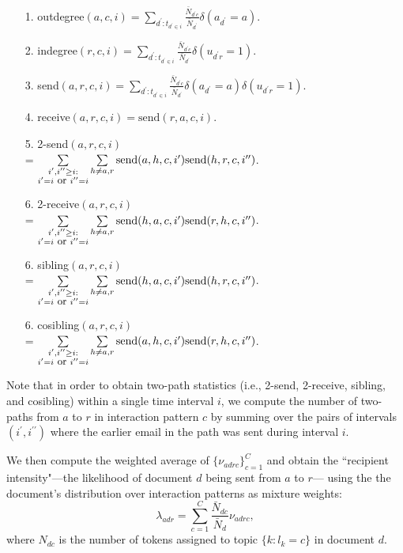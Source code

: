 \documentclass{article}
\begin{document}
\begin{itemize}
	\item[1.] outdegree$(a,c,i)=\sum\limits_{d^\prime:t_{d^\prime \in i}} \frac{\bar N_{d^\prime c}}{\bar N_{d^\prime}} \delta(a_{d^\prime} = a)$.
	\item[2.] indegree$(r,c,i)=\sum\limits_{d^\prime:t_{d^\prime \in i}} \frac{\bar N_{d^\prime c}}{\bar N_{d^\prime}} \delta(u_{d^\prime r} = 1)$.
	\item[3.] send$(a,r,c,i)=\sum\limits_{d^\prime:t_{d^\prime \in i}} \frac{\bar N_{d^\prime c}}{\bar N_{d^\prime}} \delta(a_{d^\prime} = a)\delta(u_{d^\prime r} = 1)$.
\item[4.] receive$(a,r,c,i)=\mbox{send}(r,a,c,i)$.
\item[5.] 2-send$(a,r,c,i) $\\= $\sum\limits_{\substack{i^\prime, i^{\prime\prime}\geq i:\\i^\prime = i \mbox{ \small or }i^{\prime\prime}=i}}\sum\limits_{h \neq a, r} \mbox{send}(a,h,c,i^\prime)\mbox{send}(h,r,c,i^{\prime\prime})$.
\item[6.] 2-receive$(a,r,c,i) $\\= $\sum\limits_{\substack{i^\prime, i^{\prime\prime}\geq i:\\i^\prime = i \mbox{ \small or }i^{\prime\prime}=i}}\sum\limits_{h \neq a, r} \mbox{send}(h,a,c,i^\prime)\mbox{send}(r,h,c,i^{\prime\prime})$.
\item[6.] sibling$(a,r,c,i) $\\= $\sum\limits_{\substack{i^\prime, i^{\prime\prime}\geq i:\\i^\prime = i \mbox{ \small or }i^{\prime\prime}=i}}\sum\limits_{h \neq a, r} \mbox{send}(h,a,c,i^\prime)\mbox{send}(h,r,c,i^{\prime\prime})$.
\item[6.] cosibling$(a,r,c,i) $\\= $\sum\limits_{\substack{i^\prime, i^{\prime\prime}\geq i:\\i^\prime = i \mbox{ \small or }i^{\prime\prime}=i}}\sum\limits_{h \neq a, r} \mbox{send}(a,h,c,i^\prime)\mbox{send}(r,h,c,i^{\prime\prime})$.
\end{itemize}
Note that in order to obtain two-path statistics (i.e., 2-send, 2-receive, sibling, and cosibling) within a single time interval $i$, we compute the number of two-paths from $a$ to $r$ in interaction pattern $c$ by summing over the pairs of intervals $(i^\prime, i^{\prime\prime})$ where the earlier email in the path was sent during interval $i$. 

We then compute the weighted average of $\{\nu_{adrc}\}_{c=1}^C$ and obtain the ``recipient intensity"---the likelihood of document $d$ being sent from $a$ to $r$--- using the the document's distribution over interaction patterns as mixture weights:
\begin{equation}
\lambda_{adr} =\sum_{c=1}^{C} \frac{\bar N_{dc}}{\bar N_d}\nu_{adrc},
\end{equation}
where $N_{dc}$ is the number of tokens assigned to topic $\{k:l_k=c\}$ in document $d$. 
\end{document}
